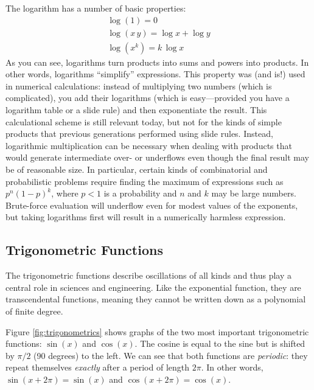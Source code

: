 The logarithm has a number of basic properties:
%
\begin{gather*}
\log( 1 ) = 0 \\
\log( x \, y ) = \log x + \log y \\
\log( x^k ) = k \, \log x
\end{gather*}
%
As you can see, logarithms turn products into sums and powers into
products. In other words, logarithms ``simplify'' expressions. This
property was (and is!) used in numerical calculations: instead of
multiplying two numbers (which is complicated), you add their
logarithms (which is easy---provided you have a logarithm table or a
slide rule) and then exponentiate the result. This calculational
scheme is still relevant today, but not for the kinds of simple
products that previous generations performed using slide rules.
Instead, logarithmic multiplication can be necessary when dealing with
products that would generate intermediate over- or underflows even
though the final result may be of reasonable size. In particular,
certain kinds of combinatorial and probabilistic problems require
finding the maximum of expressions such as $p^n (1-p)^k$, where $p<1$
is a probability and $n$ and $k$ may be\vadjust{\pagebreak} large numbers. Brute-force
evaluation will underflow even for modest values of the exponents, but
taking logarithms first will result in a numerically harmless
expression.

    
\subsection{Trigonometric Functions}


The trigonometric functions describe oscillations of all kinds and
thus play a central role in sciences and engineering. Like the
exponential function, they are transcendental functions, meaning they
cannot be written down as a polynomial of finite degree.

Figure \ref{fig:trigonometrics} shows graphs of the two most important
trigonometric functions: $\sin(x)$ and $\cos(x)$. The cosine is equal
to the sine but is shifted by $\pi/2$ (90 degrees) to the left. We
can see that both functions are \emph{periodic}: they repeat themselves
\emph{exactly} after a period of length $2\pi$. In other words, $\sin(x
+ 2\pi) = \sin(x)$ and $\cos(x + 2\pi) = \cos(x)$.

